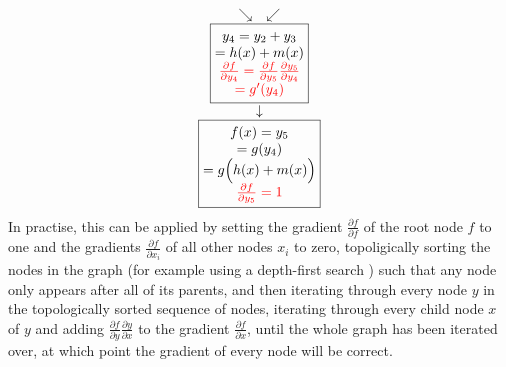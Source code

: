 \begin{equation*}
\begin{matrix}
\begin{matrix}
            \searrow & \swarrow \\
        \end{matrix} \\
        \boxed{\begin{matrix}
            y_4 = y_2+y_3 \\
            = h(x) + m(x) \\
            \color{red}{\frac{\partial f}{\partial y_4} = \frac{\partial f}{\partial y_5}\frac{\partial y_5}{\partial y_4}} \\
            \color{red}{= g'(y_4)}
        \end{matrix}} \\
        \downarrow \\
        \boxed{\begin{matrix}
            f(x) = y_5 \\
            = g(y_4) \\
            = g\Bigl(h(x) + m(x)\Bigr) \\
            \color{red}{\frac{\partial f}{\partial y_5} = 1}
        \end{matrix}}
    \end{matrix}
\end{equation*}
In practise, this can be applied by setting the gradient $\frac{\partial f}{\partial f}$ of the root node $f$ to one and the gradients $\frac{\partial f}{\partial x_i}$ of all other nodes $x_i$ to zero, topoligically sorting the nodes in the graph (for example using a depth-first search \cite{cormen2001section}) such that any node only appears after all of its parents, and then iterating through every node $y$ in the topologically sorted sequence of nodes, iterating through every child node $x$ of $y$ and adding $\frac{\partial f}{\partial y}\frac{\partial y}{\partial x}$ to the gradient $\frac{\partial f}{\partial x}$, until the whole graph has been iterated over, at which point the gradient of every node will be correct.
